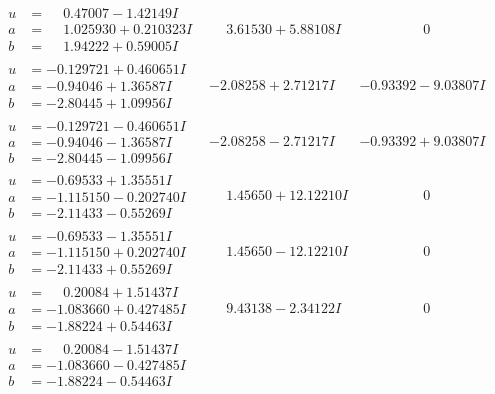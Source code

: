 \documentclass[1p]{elsarticle_modified}
\theoremstyle{definition}
\begin{document}
$$\begin{array}{c|c|c}
 \hline 
\begin{aligned}
u &= \phantom{-}0.47007 - 1.42149 I \\
a &= \phantom{-}1.025930 + 0.210323 I \\
b &= \phantom{-}1.94222 + 0.59005 I\end{aligned}
 & \phantom{-}3.61530 + 5.88108 I & \phantom{-0.000000 } 0 \\ \hline\begin{aligned}
u &= -0.129721 + 0.460651 I \\
a &= -0.94046 + 1.36587 I \\
b &= -2.80445 + 1.09956 I\end{aligned}
 & -2.08258 + 2.71217 I & -0.93392 - 9.03807 I \\ \hline\begin{aligned}
u &= -0.129721 - 0.460651 I \\
a &= -0.94046 - 1.36587 I \\
b &= -2.80445 - 1.09956 I\end{aligned}
 & -2.08258 - 2.71217 I & -0.93392 + 9.03807 I \\ \hline\begin{aligned}
u &= -0.69533 + 1.35551 I \\
a &= -1.115150 - 0.202740 I \\
b &= -2.11433 - 0.55269 I\end{aligned}
 & \phantom{-}1.45650 + 12.12210 I & \phantom{-0.000000 } 0 \\ \hline\begin{aligned}
u &= -0.69533 - 1.35551 I \\
a &= -1.115150 + 0.202740 I \\
b &= -2.11433 + 0.55269 I\end{aligned}
 & \phantom{-}1.45650 - 12.12210 I & \phantom{-0.000000 } 0 \\ \hline\begin{aligned}
u &= \phantom{-}0.20084 + 1.51437 I \\
a &= -1.083660 + 0.427485 I \\
b &= -1.88224 + 0.54463 I\end{aligned}
 & \phantom{-}9.43138 - 2.34122 I & \phantom{-0.000000 } 0 \\ \hline\begin{aligned}
u &= \phantom{-}0.20084 - 1.51437 I \\
a &= -1.083660 - 0.427485 I \\
b &= -1.88224 - 0.54463 I\end{aligned}

\end{array}$$
\end{document}
